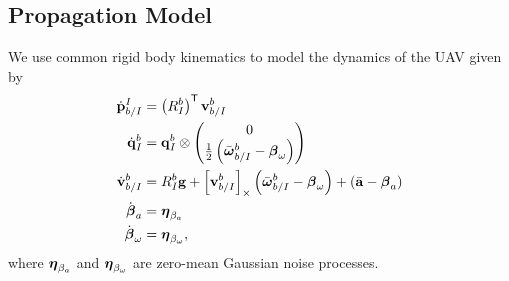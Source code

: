 
\subsection{Propagation Model}
We use common rigid body kinematics to model the dynamics of
the UAV given by
\begin{align}
  \dot{\boldsymbol{\mathrm{p}}}_{b/I}^I
  &=
  \left( R_I^b \right)^{\mathsf{T}} \boldsymbol{\mathrm{v}}_{b/I}^b
  \label{eq:uav_dynamics}
  \\
  \dot{\boldsymbol{\mathrm{q}}}_{I}^{b} 
	&= 	
  \boldsymbol{\mathrm{q}}_I^b \otimes \begin{pmatrix} 0 \\ \frac{1}{2}
  \left( \bar{\boldsymbol{\mathrm{\omega}}}_{b/I}^b - \boldsymbol{\mathrm{\beta}}_\omega \right)
\end{pmatrix} \nonumber \\
  \dot{\boldsymbol{\mathrm{v}}}_{b/I}^b 
  &=
  R_I^b \boldsymbol{\mathrm{g}}
  +
  \left[ \boldsymbol{\mathrm{v}}_{b/I}^b \right]_{\times}
  \left( \bar{\boldsymbol{\mathrm{\omega}}}_{b/I}^b - \boldsymbol{\mathrm{\beta}}_\omega \right)
  +
  \left( \bar{\boldsymbol{\mathrm{a}}} - \boldsymbol{\mathrm{\beta}}_a \right) \nonumber
  \\
  \dot{\boldsymbol{\mathrm{\beta}}}_a &= \boldsymbol{\mathrm{\eta}}_{\beta_a} \nonumber
  \\
  \dot{\boldsymbol{\mathrm{\beta}}}_\omega &= \boldsymbol{\mathrm{\eta}}_{\beta_\omega}, \nonumber
\end{align}
where $\boldsymbol{\mathrm{\eta}}_{\beta_a}$ and $\boldsymbol{\mathrm{\eta}}_{\beta_\omega}$
are zero-mean Gaussian noise processes.

